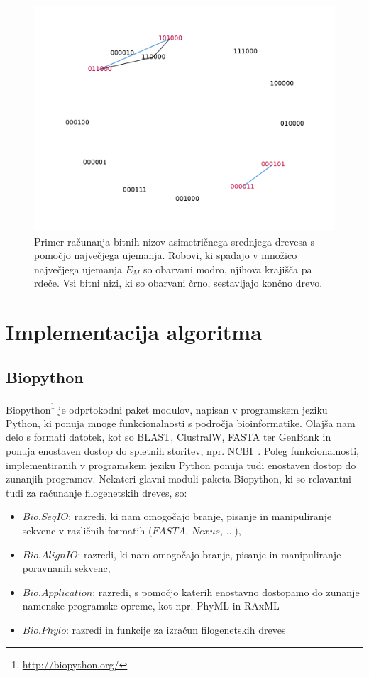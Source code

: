 \documentclass[a4paper, 12pt]{book}
\begin{document}
\begin{figure}
	\begin{center}
		\includegraphics[scale=0.65, clip=true, trim=2cm 1cm 1cm 2cm]{gfx/maxmatch_graph.pdf}
	\end{center}
	\caption{Primer računanja bitnih nizov asimetričnega srednjega drevesa s pomočjo največjega ujemanja. Robovi, ki spadajo v množico največjega ujemanja $E_{M}$ so obarvani modro, njihova krajišča pa rdeče. Vsi bitni nizi, ki so obarvani črno, sestavljajo končno drevo.}
	\label{img-maxmatch}
\end{figure}

\chapter{Implementacija algoritma}

\section{Biopython}
Biopython\footnote{\url{http://biopython.org/}} je odprtokodni paket modulov, napisan v programskem jeziku Python, ki ponuja mnoge funkcionalnosti s področja bioinformatike. Olajša nam delo s formati datotek, kot so BLAST, ClustralW, FASTA ter GenBank in ponuja enostaven dostop do spletnih storitev, npr. NCBI~\cite{biopy}. Poleg funkcionalnosti, implementiranih v programskem jeziku Python ponuja tudi enostaven dostop do zunanjih programov. Nekateri glavni moduli paketa Biopython, ki so relavantni tudi za računanje filogenetskih dreves, so: 

\begin{itemize}
	\item $Bio.SeqIO$: razredi, ki nam omogočajo branje, pisanje in manipuliranje sekvenc v različnih formatih ($FASTA$, $Nexus$, ...),
	\item $Bio.AlignIO$: razredi, ki nam omogočajo branje, pisanje in manipuliranje poravnanih sekvenc,
	\item $Bio.Application$: razredi, s pomočjo katerih enostavno dostopamo do zunanje namenske programske opreme, kot npr. PhyML in RAxML
	\item $Bio.Phylo$: razredi in funkcije za izračun filogenetskih dreves
\end{itemize} 
\end{document}
